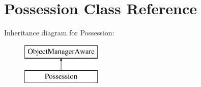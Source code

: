 \hypertarget{class_app_1_1_entity_1_1_possession}{}\section{Possession Class Reference}
\label{class_app_1_1_entity_1_1_possession}
Inheritance diagram for Possession\+:\begin{figure}[H]
\begin{center}
\leavevmode
\includegraphics[height=2.000000cm]{class_app_1_1_entity_1_1_possession}
\end{center}
\end{figure}
